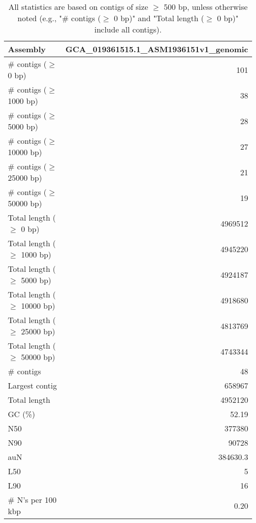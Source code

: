 \documentclass[12pt,a4paper]{article}
\begin{document}
\begin{table}[ht]
\begin{center}
\caption{All statistics are based on contigs of size $\geq$ 500 bp, unless otherwise noted (e.g., "\# contigs ($\geq$ 0 bp)" and "Total length ($\geq$ 0 bp)" include all contigs).}
\begin{tabular}{|l*{1}{|r}|}
\hline
Assembly & GCA\_019361515.1\_ASM1936151v1\_genomic \\ \hline
\# contigs ($\geq$ 0 bp) & 101 \\ \hline
\# contigs ($\geq$ 1000 bp) & 38 \\ \hline
\# contigs ($\geq$ 5000 bp) & 28 \\ \hline
\# contigs ($\geq$ 10000 bp) & 27 \\ \hline
\# contigs ($\geq$ 25000 bp) & 21 \\ \hline
\# contigs ($\geq$ 50000 bp) & 19 \\ \hline
Total length ($\geq$ 0 bp) & 4969512 \\ \hline
Total length ($\geq$ 1000 bp) & 4945220 \\ \hline
Total length ($\geq$ 5000 bp) & 4924187 \\ \hline
Total length ($\geq$ 10000 bp) & 4918680 \\ \hline
Total length ($\geq$ 25000 bp) & 4813769 \\ \hline
Total length ($\geq$ 50000 bp) & 4743344 \\ \hline
\# contigs & 48 \\ \hline
Largest contig & 658967 \\ \hline
Total length & 4952120 \\ \hline
GC (\%) & 52.19 \\ \hline
N50 & 377380 \\ \hline
N90 & 90728 \\ \hline
auN & 384630.3 \\ \hline
L50 & 5 \\ \hline
L90 & 16 \\ \hline
\# N's per 100 kbp & 0.20 \\ \hline
\end{tabular}
\end{center}
\end{table}
\end{document}
